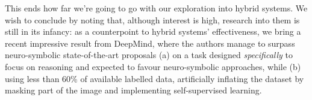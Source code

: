 \documentclass[../main.tex]{subfiles}
\begin{document}
This ends how far we're going to go with our exploration into hybrid systems. We wish to conclude by noting that, although interest is high, research into them is still in its infancy: as a counterpoint to hybrid systems' effectiveness, we bring a recent impressive result from DeepMind\cite{dingObjectbasedAttentionSpatiotemporal2020}, where the authors manage to surpass neuro-symbolic state-of-the-art proposals (a) on a task designed \textit{specifically} to focus on reasoning and expected to favour neuro-symbolic approaches\cite{yiCLEVRERCollisionEvents2019}, while (b) using less than 60\% of available labelled data, artificially inflating the dataset by masking part of the image and implementing self-supervised learning.
\end{document}
